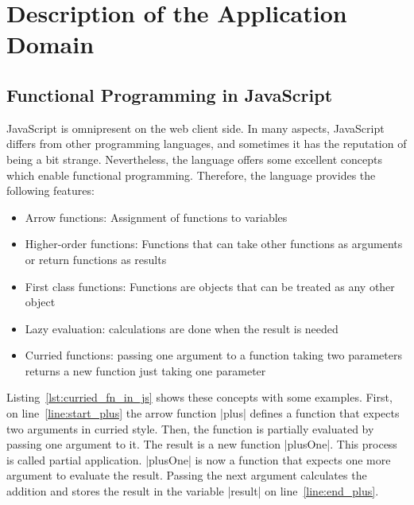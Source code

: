 \section{Description of the Application Domain}
\label{sec:Description of the Application Domain}
\subsection{Functional Programming in JavaScript}
\label{sub:Functional Programming in JavaScript}
JavaScript is omnipresent on the web client side. In many aspects, JavaScript
differs from other programming languages, and sometimes it has the reputation of
being a bit strange. Nevertheless, the language offers some excellent concepts
which enable functional programming. 
Therefore, the language provides the following features: 

\begin{itemize}
  \item{Arrow functions: Assignment of functions to variables} 
  \item{Higher-order functions: Functions that can take other functions as arguments or return functions as results}
  \item{First class functions: Functions are objects that can be treated as any other object}
  \item{Lazy evaluation: calculations are done when the result is needed}
  \item{Curried functions: passing one argument to a function taking two parameters returns a new function just taking one parameter}
\end{itemize}

Listing~\ref{lst:curried_fn_in_js} shows these concepts with some examples.
First, on line~\ref{line:start_plus} the arrow function |plus| defines a function that expects two arguments in curried style.
Then, the function is partially evaluated by passing one argument to it. 
The result is a new function |plusOne|. This process is called partial application.
|plusOne| is now a function that expects one more argument
to evaluate the result. Passing the next argument calculates the addition and
stores the result in the variable |result| on line~\ref{line:end_plus}.
\\


